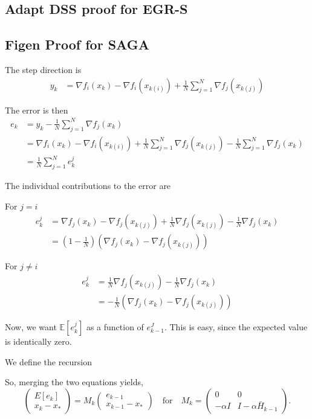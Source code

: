 \documentclass[11pt]{article}
\begin{document}
\subsection{Adapt DSS proof for EGR-S} 
\subsection{Figen Proof for SAGA}

The step direction is
\begin{align*}
	y_k &= \nabla f_i(x_k) - \nabla f_i(x_{k(i)}) + \frac{1}{N} \sum_{j=1}^N \nabla f_j(x_{k(j)})
\end{align*} 

The error is then
\begin{align*} 
	e_k &= y_k -  \frac{1}{N} \sum_{j=1}^N \nabla f_j(x_k) \\
	    &= \nabla f_i(x_k) - \nabla f_i(x_{k(i)}) + \frac{1}{N} \sum_{j=1}^N \nabla f_j(x_{k(j)}) -  \frac{1}{N} \sum_{j=1}^N \nabla f_j(x_k) \\
		& = \frac{1}{N} \sum_{j=1}^N e_k^j
\end{align*} 


The individual contributions to the error are

For $j=i$
\begin{align*} 
	e_k^j &= \nabla f_j(x_k) - \nabla f_j(x_{k(j)}) + \frac{1}{N}  \nabla f_j(x_{k(j)}) -  \frac{1}{N}  \nabla f_j(x_k) \\
	 &= (1 - \frac{1}{N})(\nabla f_j(x_k) - \nabla f_j(x_{k(j)}))
\end{align*} 

For $j \neq i$
\begin{align*} 
	e_k^j &=  \frac{1}{N}  \nabla f_j(x_{k(j)}) -  \frac{1}{N}  \nabla f_j(x_k) \\
	 &= -\frac{1}{N}(\nabla f_j(x_k) - \nabla f_j(x_{k(j)}))
\end{align*} 

Now, we want $\mathbb{E} [e^j_k]$ as a function of $e^J_{k-1}$. This is easy, since the expected value is identically zero.

We define the recursion

So, merging the two equations yields,
\[
 \begin{pmatrix} \displaystyle E[e_k] \\ x_k-x_\ast \end{pmatrix} 
= M_k
 \begin{pmatrix} \displaystyle  e_{k-1} \\ x_{k-1}-x_\ast \end{pmatrix}  \quad\mbox{for}\quad 
 M_k = \begin{pmatrix} 0 &0 \\  
                   -\alpha  I  & I-\alpha\bar H_{k-1} \end{pmatrix}.                   
\]
\end{document}
